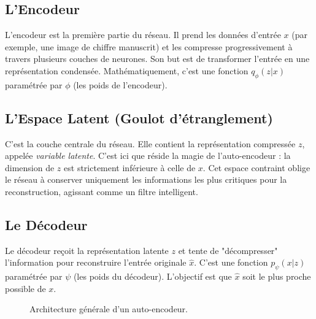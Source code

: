 \documentclass[11pt,a4paper]{report}
\begin{document}
\subsection{L'Encodeur}
L'encodeur est la première partie du réseau. Il prend les données d'entrée $x$ (par exemple, une image de chiffre manuscrit) et les compresse progressivement à travers plusieurs couches de neurones. Son but est de transformer l'entrée en une représentation condensée. Mathématiquement, c'est une fonction $q_\phi(z|x)$ paramétrée par $\phi$ (les poids de l'encodeur).

\subsection{L'Espace Latent (Goulot d'étranglement)}
C'est la couche centrale du réseau. Elle contient la représentation compressée $z$, appelée \textit{variable latente}. C'est ici que réside la magie de l'auto-encodeur : la dimension de $z$ est strictement inférieure à celle de $x$. Cet espace contraint oblige le réseau à conserver uniquement les informations les plus critiques pour la reconstruction, agissant comme un filtre intelligent.

\subsection{Le Décodeur}
Le décodeur reçoit la représentation latente $z$ et tente de "décompresser" l'information pour reconstruire l'entrée originale $\hat{x}$. C'est une fonction $p_\psi(x|z)$ paramétrée par $\psi$ (les poids du décodeur). L'objectif est que $\hat{x}$ soit le plus proche possible de $x$.

\vspace{0.5cm}
\begin{figure}[H]
\centering
{}
\caption{Architecture générale d'un auto-encodeur.}
\label{fig:architecture_ae}
\end{figure}
\vspace{0.5cm}
\end{document}
